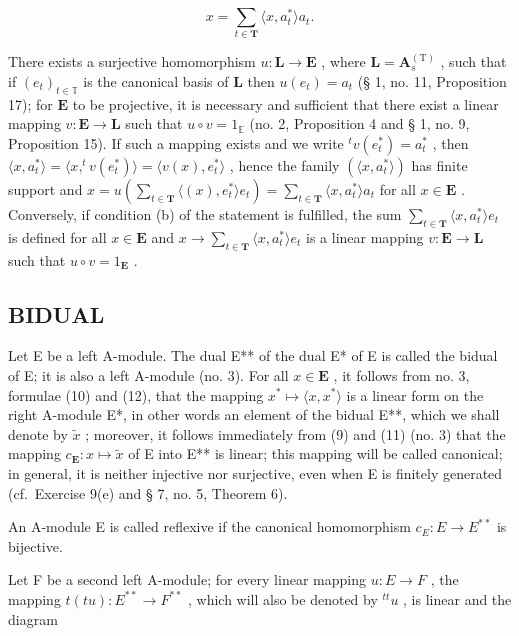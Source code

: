 \[
x = \sum_ {t \in \mathbf {T}} \langle x, a _ {t} ^ {*} \rangle a _ {t}.\tag{26}
\]

There exists a surjective homomorphism \(u: \mathbf{L} \to \mathbf{E}\) , where \(\mathbf{L} = \mathbf{A}_s^{(\mathrm{T})}\) , such that if \((e_t)_{t \in \mathbb{T}}\) is the canonical basis of \(\mathbf{L}\) then \(u(e_t) = a_t\) (§ 1, no. 11, Proposition 17); for \(\mathbf{E}\) to be projective, it is necessary and sufficient that there exist a linear mapping \(v: \mathbf{E} \to \mathbf{L}\) such that \(u \circ v = 1_{\mathbb{E}}\) (no. 2, Proposition 4 and § 1, no. 9, Proposition 15). If such a mapping exists and we write \(^tv(e_t^*) = a_t^*\) , then \(\langle x, a_t^* \rangle = \langle x, ^tv(e_t^*) \rangle = \langle v(x), e_t^* \rangle\) , hence the family \((\langle x, a_t^* \rangle)\) has finite support and \(x = u\left(\sum_{t \in \mathbf{T}} \langle (x), e_t^* \rangle e_t\right) = \sum_{t \in \mathbf{T}} \langle x, a_t^* \rangle a_t\) for all \(x \in \mathbf{E}\) . Conversely, if condition (b) of the statement is fulfilled, the sum \(\sum_{t \in \mathbf{T}} \langle x, a_t^* \rangle e_t\) is defined for all \(x \in \mathbf{E}\) and \(x \to \sum_{t \in \mathbf{T}} \langle x, a_t^* \rangle e_t\) is a linear mapping \(v: \mathbf{E} \to \mathbf{L}\) such that \(u \circ v = 1_{\mathbf{E}}\) .

\subsection{BIDUAL}

Let E be a left A-module. The dual E** of the dual E* of E is called the bidual of E; it is also a left A-module (no. 3). For all \(x \in \mathbf{E}\) , it follows from no. 3, formulae (10) and (12), that the mapping \(x^* \mapsto \langle x, x^* \rangle\) is a linear form on the right A-module E*, in other words an element of the bidual E**, which we shall denote by \(\tilde{x}\) ; moreover, it follows immediately from (9) and (11) (no. 3) that the mapping \(c_{\mathbf{E}}: x \mapsto \tilde{x}\) of E into E** is linear; this mapping will be called canonical; in general, it is neither injective nor surjective, even when E is finitely generated (cf.~Exercise 9(e) and § 7, no. 5, Theorem 6).

An A-module E is called reflexive if the canonical homomorphism \(c_{E}:E \rightarrow E^{**}\) is bijective.

Let F be a second left A-module; for every linear mapping \(u: E \to F\) , the mapping \(t(tu): E^{**} \to F^{**}\) , which will also be denoted by \({}^{tt}u\) , is linear and the diagram

